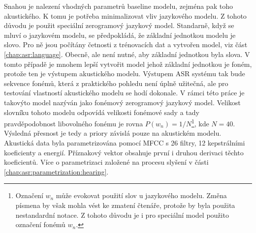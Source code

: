 Snahou je nalezení vhodných parametrů baseline modelu, zejména pak toho akustického. K tomu je potřeba minimalizovat vliv jazykového modelu. Z tohoto důvodu je použit speciální zerogramový jazykový model. Standarně, když se mluví o jazykovém modelu, se předpokládá, že základní jednotkou modelu je slovo. Pro ně jsou počítány četnosti z trénovacích dat a vytvořen model, viz část \ref{chap:asr:language}. Obecně, ale není nutné, aby základní jednotkou byla slova. V tomto případě je mnohem lepší vytvořit model jehož základní jednotkou je foném, protože ten je výstupem akustického modelu. Výstupem ASR systému tak bude sekvence fonémů, která z praktického pohledu není úplně užitečná, ale pro testování vlastností akustického modelu se hodí dokonale. V rámci této práce je takovýto model nazýván jako fonémový zerogramový jazykový model. Velikost slovníku tohoto modelu odpovídá velikosti fonémové sady a tady pravděpodobnost libovolného fonému je rovna $P(w_n) = 1/N$\footnote{Označení $w_n$ může evokovat použití slov u jazykového modelu. Změna písmena by však mohla vést ke zmatení čtenáře, protože by byla použita nestandardní notace. Z tohoto důvodu je i pro speciální model použito označení fonémů $w_n$.}, kde $N=40$. Výsledná přesnost je tedy a priory závislá pouze na akustickém modelu. Akustická data byla parametrizována pomocí MFCC s 26 filtry, 12 kepstrálními koeficienty a energií. Příznakový vektor obsahuje první i druhou derivaci těchto koeficientů. Více o parametrizaci založené na procesu slyšení v části \ref{chap:asr:parametrization:hearing}.





